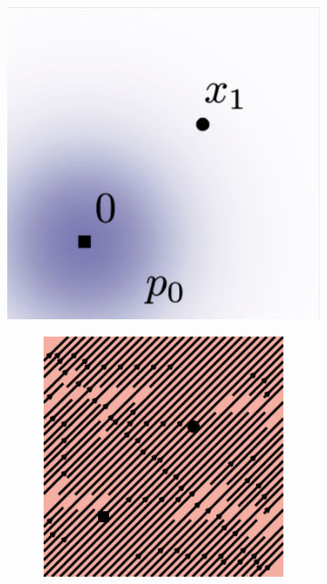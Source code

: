 \documentclass{article}
\begin{document}
\begin{figure}
\centering
\begin{subfigure}[t]{0.0989\linewidth}
\includegraphics[width=\linewidth]{figures/plots/2d_vf_reference.png}
\end{subfigure}
\begin{subfigure}[t]{0.43\linewidth}
\centering
    \begin{subfigure}[t]{0.23\linewidth}
        \centering
        \includegraphics[width=\linewidth]{figures/plots/2d_vf_flow_match_dif_0.pdf}

\end{subfigure}
\end{subfigure}
\end{figure}
\end{document}
